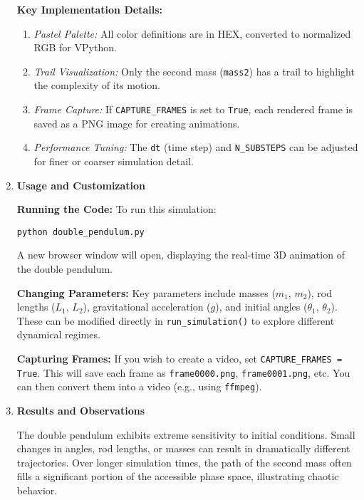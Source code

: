 \documentclass[letterpaper,12pt]{article}
\begin{document}
\begin{enumerate}[leftmargin=*, itemsep=1em]
\textbf{Key Implementation Details:}
\begin{enumerate}[itemsep=2pt, label=(\roman*)]
    \item \textit{Pastel Palette:} All color definitions are in HEX, converted to normalized RGB for VPython.
    \item \textit{Trail Visualization:} Only the second mass (\texttt{mass2}) has a trail to highlight the complexity of its motion.
    \item \textit{Frame Capture:} If \texttt{CAPTURE\_FRAMES} is set to \texttt{True}, each rendered frame is saved as a PNG image for creating animations.
    \item \textit{Performance Tuning:} The \texttt{dt} (time step) and \texttt{N\_SUBSTEPS} can be adjusted for finer or coarser simulation detail.
\end{enumerate}

\item \textbf{Usage and Customization}
\label{sec:usage}

\textbf{Running the Code:} To run this simulation:
\begin{verbatim}
python double_pendulum.py
\end{verbatim}
A new browser window will open, displaying the real-time 3D animation of the double pendulum.

\textbf{Changing Parameters:} Key parameters include masses ($m_1$, $m_2$), rod lengths ($L_1$, $L_2$), gravitational acceleration ($g$), and initial angles ($\theta_1$, $\theta_2$). These can be modified directly in \texttt{run\_simulation()} to explore different dynamical regimes.

\textbf{Capturing Frames:} If you wish to create a video, set \texttt{CAPTURE\_FRAMES = True}. This will save each frame as \texttt{frame0000.png}, \texttt{frame0001.png}, etc. You can then convert them into a video (e.g., using \texttt{ffmpeg}).

\item \textbf{Results and Observations}

The double pendulum exhibits extreme sensitivity to initial conditions. Small changes in angles, rod lengths, or masses can result in dramatically different trajectories. Over longer simulation times, the path of the second mass often fills a significant portion of the accessible phase space, illustrating chaotic behavior.


\end{enumerate}
\end{document}
